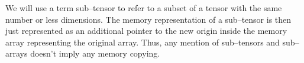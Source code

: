   We will use a term sub--tensor to refer to a subset of a tensor with
  the same number or less dimensions.  The memory representation of a
  sub--tensor is then just represented as an additional pointer to the
  new origin inside the memory array representing the original array.
  Thus, any mention of sub--tensors and sub--arrays doesn't imply any
  memory copying.
